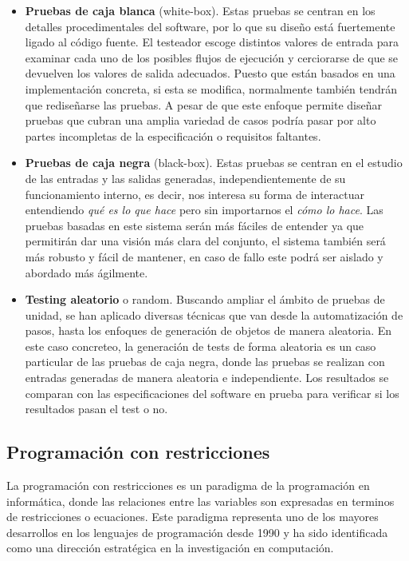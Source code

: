 \begin{itemize}
\item \textbf{Pruebas de caja blanca} (white-box). Estas pruebas se centran en los detalles procedimentales del software, por lo que su dise\~no est\'a fuertemente ligado al c\'odigo fuente. El testeador escoge distintos valores de entrada para examinar cada uno de los posibles flujos de ejecuci\'on y cerciorarse de que se devuelven los valores de salida adecuados. Puesto que est\'an basados en una implementaci\'on concreta, si esta se modifica, normalmente tambi\'en tendr\'an que redise\~narse las pruebas. A pesar de que este enfoque permite dise\~nar pruebas que cubran una amplia variedad de casos podr\'ia pasar por alto partes incompletas de la especificaci\'on o requisitos faltantes.
\item \textbf{Pruebas de caja negra} (black-box). Estas pruebas se centran en el estudio de las entradas y las salidas generadas, independientemente de su funcionamiento interno, es decir, nos interesa su forma de interactuar entendiendo {\it qu\'e es lo que hace} pero sin importarnos el {\it c\'omo lo hace}. Las pruebas basadas en este sistema ser\'an m\'as f\'aciles de entender ya que permitir\'an dar una visi\'on m\'as clara del conjunto, el sistema tambi\'en ser\'a m\'as robusto y f\'acil de mantener, en caso de fallo este podr\'a ser aislado y abordado m\'as \'agilmente.
\item \textbf{Testing aleatorio} o random. Buscando ampliar el \'ambito de pruebas de unidad, se han aplicado diversas t\'ecnicas que van desde la automatizaci\'on de pasos, hasta los enfoques de generaci\'on de objetos de manera aleatoria. En este caso concreteo, la generaci\'on de tests de forma aleatoria es un caso particular de las pruebas de caja negra, donde las pruebas se realizan con entradas generadas de manera aleatoria e independiente. Los resultados se comparan con las especificaciones del software en prueba para verificar si los resultados pasan el test o no.
\end{itemize}

\subsection{Programaci\'on con restricciones}

La programaci\'on con restricciones es un paradigma de la programaci\'on en inform\'atica, donde las relaciones entre las variables son expresadas en terminos de restricciones o ecuaciones. Este paradigma representa uno de los mayores desarrollos en los lenguajes de programaci\'on desde 1990 y ha sido identificada como una direcci\'on estrat\'egica en la investigaci\'on en computaci\'on.

